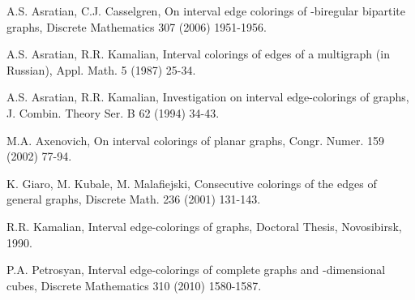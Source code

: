 \documentclass[fleqn,12pt,twoside]{article}
\begin{document}
\begin{thebibliography}{99}

 A.S. Asratian, C.J. Casselgren, On interval edge colorings of
-biregular bipartite graphs, Discrete Mathematics
307 (2006) 1951-1956.

 A.S. Asratian, R.R. Kamalian, Interval colorings of edges of a
multigraph (in Russian), Appl. Math. 5 (1987) 25-34.

 A.S. Asratian, R.R. Kamalian, Investigation on interval
edge-colorings of graphs, J. Combin. Theory Ser. B 62 (1994) 34-43.

 M.A. Axenovich, On interval colorings of planar graphs, Congr.
Numer. 159 (2002) 77-94.

 K. Giaro, M. Kubale, M. Malafiejski, Consecutive colorings of
the edges of general graphs, Discrete Math. 236 (2001) 131-143.

 R.R. Kamalian, Interval edge-colorings of graphs, Doctoral
Thesis, Novosibirsk, 1990.

 P.A. Petrosyan, Interval edge-colorings of complete graphs and
-dimensional cubes, Discrete Mathematics 310 (2010) 1580-1587.

\end{thebibliography}
\end{document}
